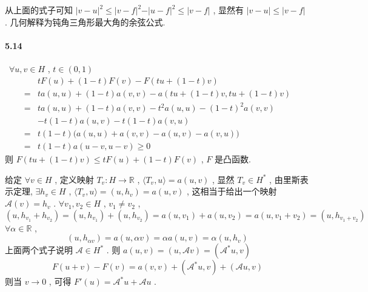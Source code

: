 \documentclass[a4paper, UTF8]{ctexart}				%
\numberwithin{equation}{section}				%
\begin{document}
	从上面的式子可知 $\vert{v - u}\vert^2 \le \vert{v - f}\vert^2 - \vert{u - f }\vert^2 \le \vert{v - f}\vert$ ,
	显然有 $\vert{v - u}\vert \le \vert{v - f}\vert$ . 几何解释为钝角三角形最大角的余弦公式.\\

	\paragraph{5.14}\, $\forall u , v \in H$ , $t \in (0, 1)$
	\begin{equation*}
		\begin{split}
				& t F(u) + (1 -t) F(v) - F(t u + (1 - t) v)\\
			=   & t a(u, u) + (1 -t) a(v, v) - a(t u + (1 - t) v, t u + (1 - t) v)\\
			=   & t a(u, u) + (1 -t) a(v, v) - t^2 a(u, u) - (1 - t)^2 a(v, v)\\
				& - t (1 - t) a(u, v) - t (1 - t) a(v, u)\\
			=   & t(1 - t) \big( a(u, u) + a(v, v) - a(u, v) - a(v, u) \big)\\
			=   & t(1 - t) a(u - v, u - v) \ge 0
		\end{split}
	\end{equation*}
	则 $F(t u + (1 - t) v) \le t F(u) + (1 -t) F(v)$ , $F$ 是凸函数.

	给定 $\forall v \in H$ , 定义映射 $T_v: H \rightarrow \mathbb{R}$ , $\langle{T_v},{u}\rangle = a(u, v)$ , 显然 $T_v \in H^*$ , 由里斯表示定理, $\exists h_v \in H$ , $\langle{T_v},{u}\rangle = ({u},{h_v}) = a(u, v)$ , 这相当于给出一个映射 $\mathcal{A}(v) = h_v$ . $\forall v_1, v_2 \in H$ , $v_1 \neq v_2$ ,
	\[
		({u},{h_{v_1}} + h_{v_2}) = ({u},{h_{v_1}}) + ({u},{h_{v_2}}) = a(u, v_1) + a(u, v_2) = a(u, v_1 + v_2) = ({u},{h_{v_1 + v_2}})
	\]
	$\forall \alpha \in \mathbb{R}$ , 
	\[
		({u},{h_{\alpha v}}) = a(u, \alpha v) = \alpha a(u, v) = \alpha ({u},{h_v})
	\]
	上面两个式子说明 $\mathcal{A} \in H^*$ . 则 $a(u, v) = ({u},{\mathcal{A} v}) = ({\mathcal{A}^* u},{v})$ 
	\[
		F(u + v) - F(v) = a(v, v) + (\mathcal{A}^* u, v) + (\mathcal{A} u, v)
	\]
	则当 $v \rightarrow 0$ , 可得 $F'(u) = \mathcal{A}^* u + \mathcal{A} u$ .\\
\end{document}
